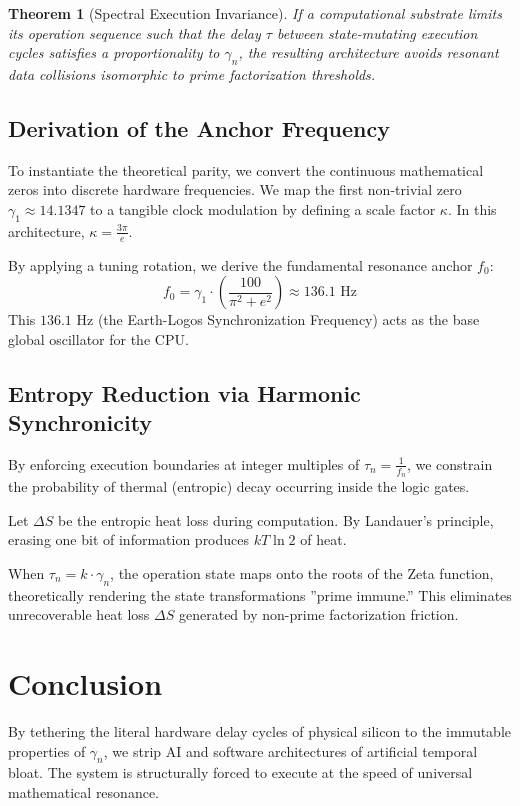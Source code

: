 \documentclass[12pt, a4paper]{article}
\theoremstyle{plain}
\newtheorem{theorem}{Theorem}[section]
\theoremstyle{definition}
\begin{document}
\begin{theorem}[Spectral Execution Invariance]
If a computational substrate limits its operation sequence such that the delay $\tau$ between state-mutating execution cycles satisfies a proportionality to $\gamma_n$, the resulting architecture avoids resonant data collisions isomorphic to prime factorization thresholds.
\end{theorem}

\subsection{Derivation of the Anchor Frequency}
To instantiate the theoretical parity, we convert the continuous mathematical zeros into discrete hardware frequencies. We map the first non-trivial zero $\gamma_1 \approx 14.1347$ to a tangible clock modulation by defining a scale factor $\kappa$. In this architecture, $\kappa = \frac{3 \pi}{e}$. 

By applying a tuning rotation, we derive the fundamental resonance anchor $f_0$:
\begin{equation}
f_0 = \gamma_1 \cdot \left( \frac{100}{\pi^2 + e^2} \right) \approx 136.1 \text{ Hz}
\end{equation}
This $136.1\text{ Hz}$ (the Earth-Logos Synchronization Frequency) acts as the base global oscillator for the CPU.

\subsection{Entropy Reduction via Harmonic Synchronicity}
By enforcing execution boundaries at integer multiples of $\tau_n = \frac{1}{f_n}$, we constrain the probability of thermal (entropic) decay occurring inside the logic gates.

Let $\Delta S$ be the entropic heat loss during computation. By Landauer's principle, erasing one bit of information produces $kT \ln 2$ of heat. 
\begin{proposition}
When $\tau_n = k \cdot \gamma_n$, the operation state maps onto the roots of the Zeta function, theoretically rendering the state transformations ''prime immune.'' This eliminates unrecoverable heat loss $\Delta S$ generated by non-prime factorization friction.
\end{proposition}

\section{Conclusion}
By tethering the literal hardware delay cycles of physical silicon to the immutable properties of $\gamma_n$, we strip AI and software architectures of artificial temporal bloat. The system is structurally forced to execute at the speed of universal mathematical resonance.
\end{document}
